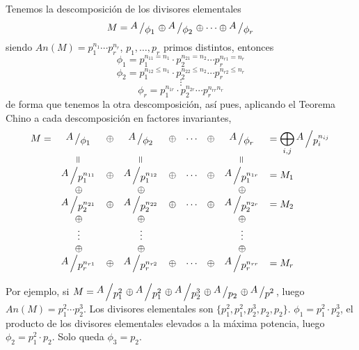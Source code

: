 Tenemos la descomposici\'on de los divisores elementales
$$M = \modulo{A}{\phi_1} \oplus \modulo{A}{\phi_2} \oplus \cdots \oplus \modulo{A}{\phi_r} $$
siendo $An(M) = p_1^{n_1} \cdots p_r^{n_r}$, $p_1, \ldots, p_r$ primos distintos, entonces
$$\phi_1 = p_1^{n_{11}=n_1} \cdot p_2^{n_{21}=n_2} \cdots p_r^{n_{r1} = n_r}$$
$$\phi_2 = p_1^{n_{12}\leq n_1} \cdot p_2^{n_{22}\leq n_2} \cdots p_r^{n_{r2} \leq n_r}$$
$$\vdots$$
$$\phi_r = p_1^{n_{1r}} \cdot p_2^{n_{2r}} \cdots p_r^{n_{rr}  n_r}$$
de forma que tenemos la otra descomposici\'on, as\'i pues, aplicando el Teorema Chino a cada descomposici\'on en factores invariantes, 
$$\begin{array}{ccccccccl}
    M = & \modulo{A}{\phi_1} & \oplus &  \modulo{A}{\phi_2} & \oplus & \cdots& \oplus & \modulo{A}{\phi_r} & = \displaystyle \bigoplus_{i,j} \modulo{A}{p_i^{n_{ij}}}\\ 
    & \rotatebox{90}{=}  & & \rotatebox{90}{=}&  && & \rotatebox{90}{=} & \\
    & \modulo{A}{p_1^{n_{11}}}  & \oplus & \modulo{A}{p_1^{n_{12}}}& \oplus&\cdots& \oplus& \modulo{A}{p_1^{n_{1r}}}& = M_1\\
    & \oplus & & \oplus & & & & \oplus \\ 
    & \modulo{A}{p_2^{n_{21}}}  &\oplus &\modulo{A}{p_2^{n_{22}}}& \oplus & \cdots& \oplus &\modulo{A}{p_2^{n_{2r}}} & = M_2\\
    & \oplus & & \oplus& & &&\oplus \\ 
    & \vdots & &\vdots && &&\vdots \\ 
    & \oplus &  &\oplus && &&\oplus \\ 
    & \modulo{A}{p_r^{n_{r1}}} &\oplus &\modulo{A}{p_r^{n_{r2}}}& \oplus &\cdots& \oplus & \modulo{A}{p_r^{n_{rr}}}& = M_r\\
\end{array}$$

Por ejemplo, si $M =\modulo{A}{p_1^2} \oplus \modulo{A}{p_1^2} \oplus \modulo{A}{p_2^3} \oplus \modulo{A}{p_2} \oplus \modulo{A}{p^2}$, luego $An(M) = p_1^2 \cdots p_2^3$. Los divisores elementales son $\{p_1^2, p_1^2, p_2^3, p_2, p_2\}$. $\phi_1 = p_1^2 \cdot p_2^3$, el producto de los divisores elementales elevados a la m\'axima potencia, luego $\phi_2 = p_1^2 \cdot p_2$. Solo queda $\phi_3 = p_2$. 

